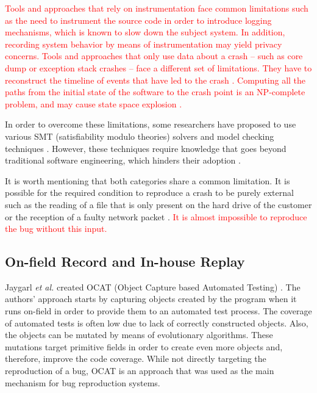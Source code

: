 \documentclass[times, doublespace]{smrauth}
\newcommand{\red}[1]{\textcolor{red}{#1}}
\begin{document}
\red{Tools and approaches that rely on instrumentation face common limitations such as the need to instrument the source code in order to introduce logging mechanisms\cite{Narayanasamy2005,Jaygarl,Artzi2008}, which is known to slow down the subject system.
In addition,  recording system behavior by means of instrumentation may yield privacy concerns.
Tools and approaches that only use data about a crash -- such as core dump or exception stack crashes -- face a different set of limitations. They have to reconstruct the timeline of events that have led to the crash \cite{Chen2013a,Nayrolles2015}. Computing all the paths from the initial state of the software to the crash point is an NP-complete problem, and may cause state space explosion \cite{Chen2013a,Clause2007}.}

In order to overcome these limitations, some researchers have proposed to
use various SMT (satisfiability modulo theories) solvers \cite{Dutertre2006}
and model checking techniques \cite{Visser2003}.
However, these techniques require knowledge that goes beyond traditional
software engineering, which hinders their adoption  \cite{Visser2004}.

It is worth mentioning that both categories share a common limitation.
It is possible for the required condition to reproduce a crash to be purely
external such as the reading of a file that is only present on the hard
drive of the customer or the reception of a faulty network packet
\cite{Chen2013a, Nayrolles2015}.
\red{It is almost impossible to reproduce the bug without this input.}



\subsection{On-field Record and In-house Replay}

Jaygarl {\it et al.} created OCAT (Object Capture based Automated Testing)
\cite{Jaygarl}.
The authors' approach starts by capturing objects created by the program when
it runs on-field in order to provide them to an automated test process.
The coverage of automated tests is often low due to lack of correctly
constructed objects. Also, the objects can be mutated by means of
evolutionary algorithms.
These mutations target primitive fields in order to create even more objects
and, therefore, improve the code coverage.
While not directly targeting the reproduction of a bug,
OCAT is an approach that was used as the main mechanism
for bug reproduction systems.
\end{document}
